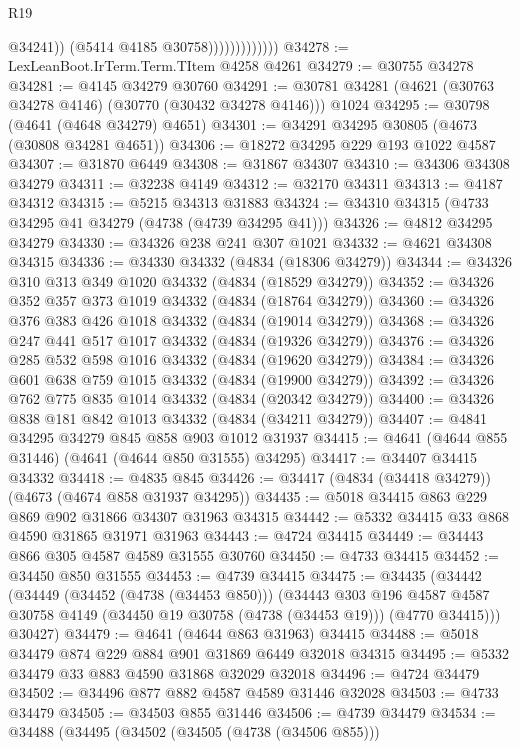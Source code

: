 \begin{lexlean}{R19}
\begin{coremodule}
                                @34241))
                            (@5414 @4185 @30758)))))))))))))
@34278 := LexLeanBoot.IrTerm.Term.TItem @4258 @4261
@34279 := @30755 @34278
@34281 := @4145 @34279 @30760
@34291 := @30781 @34281 (@4621 (@30763 @34278 @4146) (@30770 (@30432 @34278 @4146))) @1024
@34295 := @30798 (@4641 (@4648 @34279) @4651)
@34301 := @34291 @34295 @30805 (@4673 (@30808 @34281 @4651))
@34306 := @18272 @34295 @229 @193 @1022 @4587
@34307 := @31870 @6449
@34308 := @31867 @34307
@34310 := @34306 @34308 @34279
@34311 := @32238 @4149
@34312 := @32170 @34311
@34313 := @4187 @34312
@34315 := @5215 @34313 @31883
@34324 := @34310 @34315 (@4733 @34295 @41 @34279 (@4738 (@4739 @34295 @41)))
@34326 := @4812 @34295 @34279
@34330 := @34326 @238 @241 @307 @1021
@34332 := @4621 @34308 @34315
@34336 := @34330 @34332 (@4834 (@18306 @34279))
@34344 := @34326 @310 @313 @349 @1020 @34332 (@4834 (@18529 @34279))
@34352 := @34326 @352 @357 @373 @1019 @34332 (@4834 (@18764 @34279))
@34360 := @34326 @376 @383 @426 @1018 @34332 (@4834 (@19014 @34279))
@34368 := @34326 @247 @441 @517 @1017 @34332 (@4834 (@19326 @34279))
@34376 := @34326 @285 @532 @598 @1016 @34332 (@4834 (@19620 @34279))
@34384 := @34326 @601 @638 @759 @1015 @34332 (@4834 (@19900 @34279))
@34392 := @34326 @762 @775 @835 @1014 @34332 (@4834 (@20342 @34279))
@34400 := @34326 @838 @181 @842 @1013 @34332 (@4834 (@34211 @34279))
@34407 := @4841 @34295 @34279 @845 @858 @903 @1012 @31937
@34415 := @4641 (@4644 @855 @31446) (@4641 (@4644 @850 @31555) @34295)
@34417 := @34407 @34415 @34332
@34418 := @4835 @845
@34426 := @34417 (@4834 (@34418 @34279)) (@4673 (@4674 @858 @31937 @34295))
@34435 := @5018 @34415 @863 @229 @869 @902 @31866 @34307 @31963 @34315
@34442 := @5332 @34415 @33 @868 @4590 @31865 @31971 @31963
@34443 := @4724 @34415
@34449 := @34443 @866 @305 @4587 @4589 @31555 @30760
@34450 := @4733 @34415
@34452 := @34450 @850 @31555
@34453 := @4739 @34415
@34475 := @34435
    (@34442
      (@34449
        (@34452 (@4738 (@34453 @850)))
        (@34443
          @303
          @196
          @4587
          @4587
          @30758
          @4149
          (@34450 @19 @30758 (@4738 (@34453 @19)))
          (@4770 @34415)))
      @30427)
@34479 := @4641 (@4644 @863 @31963) @34415
@34488 := @5018 @34479 @874 @229 @884 @901 @31869 @6449 @32018 @34315
@34495 := @5332 @34479 @33 @883 @4590 @31868 @32029 @32018
@34496 := @4724 @34479
@34502 := @34496 @877 @882 @4587 @4589 @31446 @32028
@34503 := @4733 @34479
@34505 := @34503 @855 @31446
@34506 := @4739 @34479
@34534 := @34488
    (@34495
      (@34502
        (@34505 (@4738 (@34506 @855)))

\end{coremodule}
\end{lexlean}
